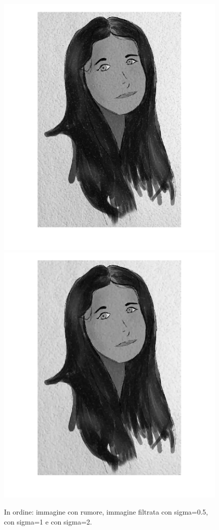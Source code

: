 \begin{figure}[htb]
\includegraphics[scale=0.15,trim={0cm 0cm 3cm 0cm},clip]{Pictures/Esempi di utilizzo/Esempio 5/ami_filtrata_sigma1_resize.png}
\includegraphics[scale=0.15,trim={3cm 0cm 0cm 0cm},clip]{Pictures/Esempi di utilizzo/Esempio 5/ami_filtrata_sigma2_resize.png}
\caption{In ordine: immagine con rumore, immagine filtrata con sigma=0.5, con sigma=1 e con sigma=2.}\label{fig:figura}
\end{figure} 
